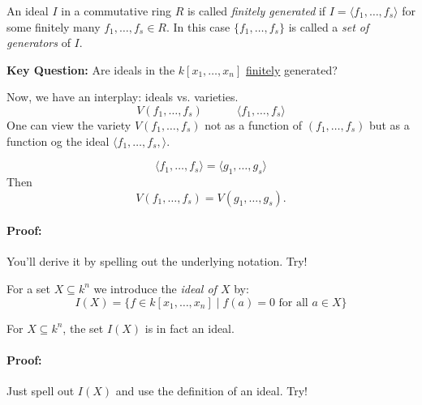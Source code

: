 \begin{definition}[title = Definition 1.4.5]
    An ideal $I$ in a commutative ring $R$ is called \textit{finitely generated} if $I = \langle f_1, \ldots, f_s \rangle$ for some finitely many $f_1, \ldots, f_s \in R$. 
    In this case $\{f_1, \ldots, f_s\}$ is called a \textit{set of generators} of $I$.
\end{definition}

\begin{tcolorbox}[sharp corners, colframe=black!75!black]
    \textbf{Key Question:} Are ideals in the $k[x_1, \dots, x_n]$ \underline{finitely} generated?  
\end{tcolorbox}

Now, we have an interplay: ideals vs. varieties. 
\[V(f_1, \ldots, f_s) \quad \quad \quad \langle f_1, \ldots, f_s \rangle\]
One can view the variety $V(f_1, \ldots, f_s)$ not as a function of $(f_1, \ldots, f_s)$ but as a function og the ideal $\langle f_1, \ldots, f_s, \rangle$. 

\clearpage
\begin{proposition}[title = Proposition 1.4.6]
    \[\langle f_1, \ldots, f_s \rangle = \langle g_1, \ldots, g_s \rangle\] 
    Then \[V(f_1, \ldots, f_s) = V(g_1, \ldots, g_s).\] 

    \paragraph{Proof:} You'll derive it by spelling out the underlying notation. Try! 
\end{proposition} 

\begin{definition}[title = Definition 1.4.7]
    For a set $X \subseteq k^n$ we introduce the \textit{ideal of $X$} by: 
    \[I(X) = \{f \in k[x_1, \dots, x_n] \mid f(a) = 0 \text{ for all } a \in X\}\]
\end{definition}

\begin{lemma}[title = Lemma 1.4.8]
    For $X \subseteq k^n$, the set $I(X)$ is in fact an ideal. 

    \paragraph{Proof:} Just spell out $I(X)$ and use the definition of an ideal. Try! 
\end{lemma}

